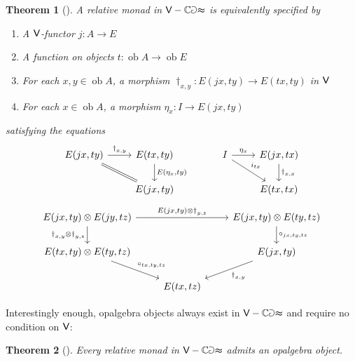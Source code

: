 \documentclass[10pt,a4paper]{article}
\newcommand{\bb}[1]{\mathbb{#1}}
\newcommand{\cat}[1]{\textcat{#1}}
\newcommand{\textcat}[1]{{\normalfont\textsf{#1}}}
\DeclareMathOperator{\ob}{ob}
\theoremstyle{plain}
\newtheorem{theorem}{Theorem}[subsection]
\theoremstyle{definition}
\theoremstyle{remark}
\begin{document}
\begin{theorem}[{\cite[Theorem 8.12]{arkor2024formaltheoryrelativemonads}}]
    A relative monad in $\cat V-\bb{Cat}$ is equivalently specified by
    \begin{enumerate}
        \item A $\cat V$-functor $j : A \to E$
        \item A function on objects $t : \ob A \to \ob E$
        \item For each $x, y\in\ob A$, a morphism $\dag_{x,y} : E(jx, ty) \to E(tx, ty)$ in $\cat V$
        \item For each $x\in\ob A$, a morphism $\eta_x : I \to E(jx, ty)$
    \end{enumerate}
    satisfying the equations
    \[\begin{tikzcd}
        E(jx, ty) \ar[dr, equal] \ar[r, "\dag_{x, y}"] & E(tx, ty) \ar[d, "{E(\eta_x, ty)}"]\\
                                                       & E(jx, ty)
    \end{tikzcd}
    \hspace{3em}
    \begin{tikzcd}
        I \ar[dr, "i_{tx}"] \ar[r, "\eta_x"] & E(jx, tx) \ar[d, "\dag_{x,x}"]\\
                                               & E(tx, tx)
    \end{tikzcd}\]
    \[\begin{tikzcd}
        \ar[d, "\dag_{x,y}\otimes\dag_{y,z}"'] E(jx, ty)\otimes E(jy, tz) \ar[rr, "{E(jx, ty)\otimes\dag_{y, z}}"] && E(jx, ty)\otimes E(ty, tz) \ar[d, "\circ_{jx, ty, tz}"]\\
        E(tx, ty)\otimes E(ty, tz) \ar[dr, "\circ_{tx, ty, tz}"] && E(jx, ty) \ar[dl, "\dag_{x, y}"]\\
                                                                 & E(tx, tz)
    \end{tikzcd}\]
\end{theorem}

Interestingly enough, opalgebra objects always exist in $\cat V-\bb{Cat}$ and require no condition on $\cat V$:

\begin{theorem}[{\cite[Theorem 8.21]{arkor2024formaltheoryrelativemonads}}]
    Every relative monad in $\cat V-\bb{Cat}$ admits an opalgebra object.
\end{theorem}
\end{document}

